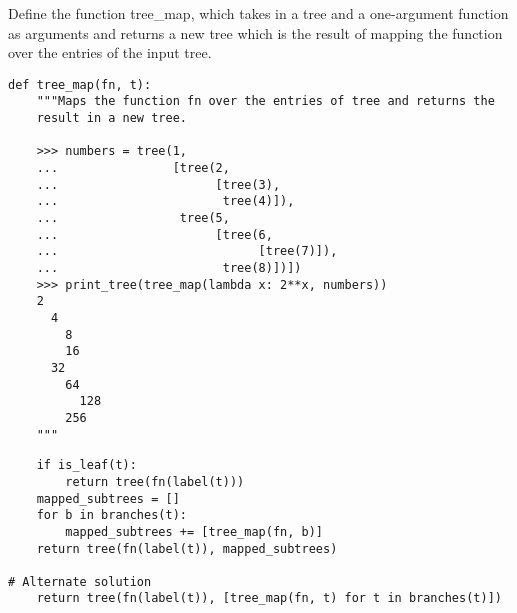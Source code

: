 \question
Define the function tree\_map, which takes in a tree and a
one-argument function as arguments and returns a new tree which is the
result of mapping the function over the entries of the input tree.
\begin{lstlisting}
def tree_map(fn, t):
    """Maps the function fn over the entries of tree and returns the
    result in a new tree.

    >>> numbers = tree(1,
    ...                [tree(2,
    ...                      [tree(3),
    ...                       tree(4)]),
    ...                 tree(5,
    ...                      [tree(6,
    ...                            [tree(7)]),
    ...                       tree(8)])])
    >>> print_tree(tree_map(lambda x: 2**x, numbers))
    2
      4
        8
        16
      32
        64
          128
        256
    """
\end{lstlisting}
\begin{solution}
\begin{lstlisting}
    if is_leaf(t):
        return tree(fn(label(t)))
    mapped_subtrees = []
    for b in branches(t):
        mapped_subtrees += [tree_map(fn, b)]
    return tree(fn(label(t)), mapped_subtrees)

# Alternate solution
    return tree(fn(label(t)), [tree_map(fn, t) for t in branches(t)])
\end{lstlisting}
\end{solution}
